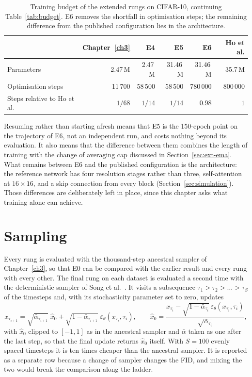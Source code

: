 \begin{table}[htbp]
    \centering
    \caption{Training budget of the extended rungs on CIFAR-10, continuing
    Table~\ref{tab:budget}. E6 removes the shortfall in optimisation steps; the remaining
    difference from the published configuration lies in the architecture.}
    \label{tab:ext-budget}
    \begin{tabular}{lrrrrr}
        \toprule
        & Chapter~\ref{ch3} & E4 & E5 & E6 & Ho et al. \\
        \midrule
        Parameters         & 2.47\,M & 2.47\,M & 31.46\,M & 31.46\,M & 35.7\,M \\
        Optimisation steps & 11\,700 & 58\,500 & 58\,500  & 780\,000 & 800\,000 \\
        Steps relative to Ho et al. & $1/68$ & $1/14$ & $1/14$ & $0.98$ & $1$ \\
        \bottomrule
    \end{tabular}
\end{table}

Resuming rather than starting afresh means that E5 is the 150-epoch point on the trajectory of E6,
not an independent run, and costs nothing beyond its evaluation. It also means that the difference
between them combines the length of training with the change of averaging cap discussed in
Section~\ref{sec:ext-ema}. What remains between E6 and the published configuration is the
architecture: the reference network has four resolution stages rather than three, self-attention at
$16 \times 16$, and a skip connection from every block (Section~\ref{sec:simulation}). Those
differences are deliberately left in place, since this chapter asks what training alone can achieve.

\section{Sampling}
\label{sec:ext-sampling}

Every rung is evaluated with the thousand-step ancestral sampler of Chapter~\ref{ch3}, so that E0
can be compared with the earlier result and every rung with every other. The final rung on each
dataset is evaluated a second time with the deterministic sampler of Song et al.\
\parencite{arXiv:2010.02502}. It visits a subsequence $\tau_1 > \tau_2 > \dots > \tau_S$ of the
timesteps and, with its stochasticity parameter set to zero, updates
\begin{equation}
    x_{\tau_{i+1}} = \sqrt{\bar\alpha_{\tau_{i+1}}}\;\hat{x}_0
    + \sqrt{1 - \bar\alpha_{\tau_{i+1}}}\;\varepsilon_\theta(x_{\tau_i}, \tau_i),
    \qquad
    \hat{x}_0 = \frac{x_{\tau_i} - \sqrt{1 - \bar\alpha_{\tau_i}}\,
    \varepsilon_\theta(x_{\tau_i}, \tau_i)}{\sqrt{\bar\alpha_{\tau_i}}},
    \label{eq:ext-ddim}
\end{equation}
with $\hat{x}_0$ clipped to $[-1, 1]$ as in the ancestral sampler and $\bar\alpha$ taken as one after
the last step, so that the final update returns $\hat{x}_0$ itself. With $S = 100$ evenly spaced
timesteps it is ten times cheaper than the ancestral sampler. It is reported as a separate row because
a change of sampler changes the FID, and mixing the two would break the comparison along the ladder.

